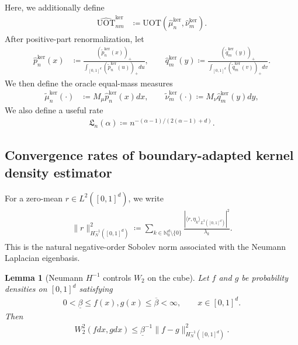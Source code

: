 \documentclass[11pt,reqno]{amsart}
\newtheorem{lemma}[theorem]{Lemma}
\theoremstyle{definition}
\renewcommand{\hat}{\widehat}
\renewcommand{\tilde}{\widetilde}
\begin{document}
Here, we additionally define
\begin{align}
    \widehat{\mathrm{UOT}}_{nm}^{\mathrm{ker}}
    &\coloneqq
    \mathrm{UOT}(\hat\mu_n^{\mathrm{ker}},\hat\nu_m^{\mathrm{ker}}).
\end{align}
After positive-part renormalization, let
\begin{align}
    \hat p_n^{\mathrm{ker}}(x)
    &\coloneqq
    \frac{(\tilde p_n^{\mathrm{ker}}(x))_+}
    {\int_{[0,1]^d}(\tilde p_n^{\mathrm{ker}}(u))_+ du},
    \qquad
    \hat q_m^{\mathrm{ker}}(y)
    \coloneqq
    \frac{(\tilde q_m^{\mathrm{ker}}(y))_+}
    {\int_{[0,1]^d}(\tilde q_m^{\mathrm{ker}}(v))_+ dv}.
\end{align}
We then define the oracle equal-mass measures
\begin{align}
    \tilde\mu_n^{\mathrm{ker}}(\cdot)
    &\coloneqq
    M_\mu \hat p_n^{\mathrm{ker}}(x) dx,
    \qquad
    \tilde\nu_m^{\mathrm{ker}}(\cdot)
    \coloneqq
    M_\nu \hat q_m^{\mathrm{ker}}(y) dy,
\end{align}
We also define a useful rate
\begin{align}
    \mathfrak L_n(\alpha)
    \coloneqq
    n^{{-(\alpha-1)/(2(\alpha-1)+d)}}.
\end{align}



\subsection{Convergence rates of boundary-adapted kernel density estimator}

For a zero-mean $r\in L^2([0,1]^d)$, we write
\begin{align}
\label{eq:neumann_hminus1_norm}
    \|r\|_{H^{-1}_N([0,1]^d)}^2
    \coloneqq
    \sum_{k\in\mathbb{N}_0^d\setminus\{0\}}
    \frac{|\langle r,\eta_k\rangle_{L^2([0,1]^d)}|^2}{\lambda_k}.
\end{align}
This is the natural negative-order Sobolev norm associated with the Neumann Laplacian eigenbasis.

\begin{lemma}[Neumann $H^{-1}$ controls $W_2$ on the cube]
\label{lem:cube_hminus1_to_w2}
Let $f$ and $g$ be probability densities on $[0,1]^d$ satisfying
\begin{align}
    0<\underline\beta \le f(x),g(x) \le \overline\beta < \infty,
    \qquad x\in[0,1]^d.
\end{align}
Then
\begin{align}
\label{eq:cube_hminus1_to_w2}
    W_2^2(f dx,g dx)
    \le
    \underline\beta^{-1}
    \|f-g\|_{H^{-1}_N([0,1]^d)}^2.
\end{align}
\end{lemma}
\end{document}

